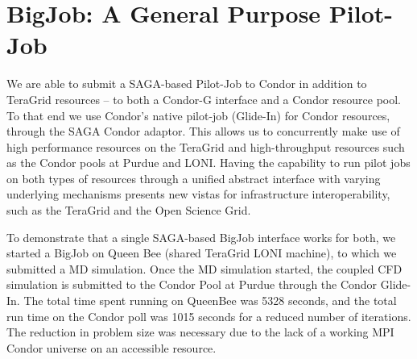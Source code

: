 \documentclass[conference,final]{IEEEtran}
\begin{document}
\section{BigJob: A General Purpose Pilot-Job}

We are able to submit a SAGA-based Pilot-Job to Condor in addition to TeraGrid resources -- to both a Condor-G interface and a Condor resource pool. To that end we use Condor's native pilot-job (Glide-In) for Condor resources, through the SAGA Condor adaptor. This allows us to concurrently make use of high performance resources on the TeraGrid and high-throughput resources such as the Condor pools at Purdue and LONI. Having the capability to run pilot jobs on both types of resources through a unified abstract interface with varying underlying mechanisms presents new vistas for infrastructure interoperability, such as the TeraGrid and the Open Science Grid.

To demonstrate that a single SAGA-based BigJob interface works for both, we started a BigJob on Queen Bee (shared TeraGrid LONI machine), to which we submitted a MD simulation. Once the MD simulation started, the coupled CFD simulation is submitted to the Condor Pool at Purdue through the Condor Glide-In. The total time spent running on QueenBee was 5328 seconds, and the total run time on the Condor poll was 1015 seconds for a reduced number of iterations. The reduction in problem size was necessary due to the lack of a working MPI Condor universe on an accessible resource.
\end{document}
